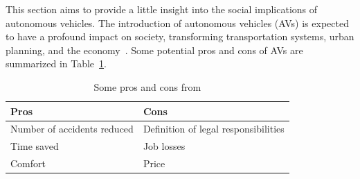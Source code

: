 This section aims to provide a little insight into the social implications of autonomous vehicles.
The introduction of autonomous vehicles (AVs) is expected to have a profound impact on society\cite{thomas2020perception},
transforming transportation systems\cite{intelligent_transportation_2023}, urban planning\cite{impact_autonomous_vehicles_2018},
and the economy~\cite{economic_aspects_2020}.
Some potential pros and cons of AVs are summarized in Table~\ref{tab:table}.

\begin{table}[ht]
    \centering
    \begin{tabular}{|l|l|}
        \hline
        \textbf{Pros} & \textbf{Cons} \\ \hline
        Number of accidents reduced & Definition of legal responsibilities \\ \hline
        Time saved & Job losses \\ \hline
        Comfort & Price \\ \hline
    \end{tabular}
    \caption{Some pros and cons from \cite{ahangar2021survey} }\label{tab:table}
\end{table}
